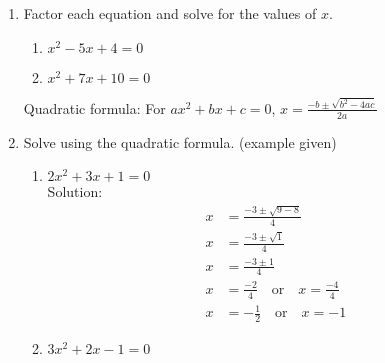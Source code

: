 \documentclass[12pt, twoside]{article}
\begin{document}
\begin{enumerate}
\item Factor each equation and solve for the values of $x$.
  \begin{multicols}{2}
    \begin{enumerate}[itemsep=5cm]
    \item $x^2-5x+4=0$
    \item $x^2+7x+10=0$
  \end{enumerate}
  \end{multicols} \vspace{5cm}

Quadratic formula: For $ax^2+bx+c=0$, $\displaystyle x=\frac{-b \pm \sqrt{b^2-4ac}}{2a}$
\item Solve using the quadratic formula. (example given)
\begin{multicols}{2}
  \begin{enumerate}[itemsep=5cm]
    \item $2x^2 + 3x + 1 = 0$ \\[0.5cm]
    Solution:
      \begin{align*}
        x &= \frac{-3 \pm \sqrt{9 - 8}}{4} \\
        x &= \frac{-3 \pm \sqrt{1}}{4} \\
        x &= \frac{-3 \pm 1}{4} \\
        x &= \frac{-2}{4} \quad \text{or} \quad x = \frac{-4}{4} \\
        x &= -\frac{1}{2} \quad \text{or} \quad x = -1
      \end{align*}
      \item $3x^2 + 2x - 1 = 0$
  \end{enumerate}
  \end{multicols} \vspace{4cm}


\end{enumerate}
\end{document}
